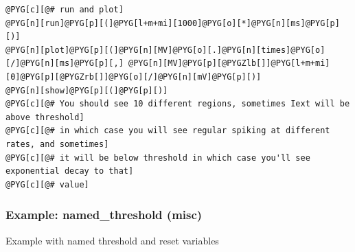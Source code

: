 \documentclass[letterpaper,10pt,english]{manual}
\begin{document}
\begin{Verbatim}[commandchars=@\[\]]
@PYG[c][@# run and plot]
@PYG[n][run]@PYG[p][(]@PYG[l+m+mi][1000]@PYG[o][*]@PYG[n][ms]@PYG[p][)]
@PYG[n][plot]@PYG[p][(]@PYG[n][MV]@PYG[o][.]@PYG[n][times]@PYG[o][/]@PYG[n][ms]@PYG[p][,] @PYG[n][MV]@PYG[p][@PYGZlb[]]@PYG[l+m+mi][0]@PYG[p][@PYGZrb[]]@PYG[o][/]@PYG[n][mV]@PYG[p][)]
@PYG[n][show]@PYG[p][(]@PYG[p][)]
@PYG[c][@# You should see 10 different regions, sometimes Iext will be above threshold]
@PYG[c][@# in which case you will see regular spiking at different rates, and sometimes]
@PYG[c][@# it will be below threshold in which case you'll see exponential decay to that]
@PYG[c][@# value]
\end{Verbatim}

\resetcurrentobjects
\hypertarget{--doc-examples-misc_named_threshold}{}

\hypertarget{index-54}{}\subsubsection{Example: named\_threshold (misc)}

Example with named threshold and reset variables
\end{document}
